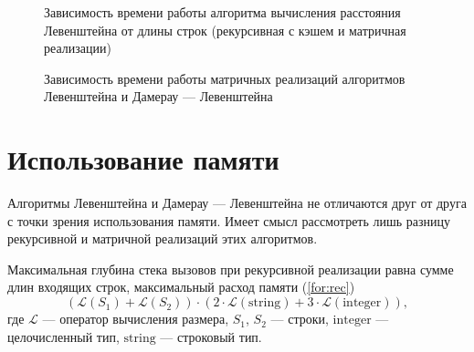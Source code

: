 \begin{figure}[h]
	\centering
	\captionsetup{justification=centering}
	\caption{Зависимость времени работы алгоритма вычисления расстояния Левенштейна от длины строк (рекурсивная с кэшем и матричная реализации)}
\label{plt:time_levenshtein}
\end{figure}

\begin{figure}[h]
	\centering
	\captionsetup{justification=centering}
	\caption{Зависимость времени работы матричных реализаций алгоритмов Левенштейна и Дамерау — Левенштейна}
	\label{plt:time_dl}
\end{figure}


\section{Использование памяти}

Алгоритмы Левенштейна и Дамерау — Левенштейна не отличаются друг от друга с точки зрения использования памяти.
Имеет смысл рассмотреть лишь разницу рекурсивной и матричной реализаций этих алгоритмов.

Максимальная глубина стека вызовов при рекурсивной реализации равна сумме длин входящих строк, максимальный расход памяти (\ref{for:rec})
\begin{equation}
(\mathcal{L}(S_1) + \mathcal{L}(S_2)) \cdot (2 \cdot \mathcal{L}\mathrm{(string)} + 3 \cdot \mathcal{L}\mathrm{(integer)}),
\label{for:rec}
\end{equation}
где $\mathcal{L}$ — оператор вычисления размера, $S_1$, $S_2$ — строки, $\mathrm{integer}$ — целочисленный тип, $\mathrm{string}$ — строковый тип.

